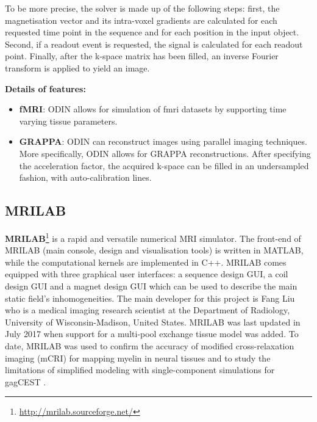 \hfill

To be more precise, the solver is made up of the following steps: first, the magnetisation vector and its intra-voxel gradients are calculated for each requested time point in the sequence and for each position in the input object.
Second, if a readout event is requested, the signal is calculated for each readout point.
Finally, after the k-space matrix has been filled, an inverse Fourier transform is applied to yield an image.

\hfill

\textbf{Details of features:}
\begin{itemize}
    
    \item \textbf{fMRI}: ODIN allows for simulation of \ac{fmri} datasets by supporting time varying tissue parameters.
    
    \item \textbf{GRAPPA}: ODIN can reconstruct images using parallel imaging techniques.
    More specifically, ODIN allows for GRAPPA reconstructions.
    After specifying the acceleration factor, the acquired k-space can be filled in an undersampled fashion, with auto-calibration lines.
    
\end{itemize}

\hfill

\subsection{MRILAB}
\textbf{MRILAB}\footnote{\url{http://mrilab.sourceforge.net/}} is a rapid and versatile numerical MRI simulator. 
The front-end of MRILAB (main console, design and visualisation tools) is written in MATLAB, while the computational kernels are implemented in C++.
MRILAB comes equipped with three graphical user interfaces: a sequence design GUI, a coil design GUI and a magnet design GUI which can be used to describe the main static field's inhomogeneities.
The main developer for this project is Fang Liu who is a medical imaging research scientist at the Department of Radiology, University of Wisconsin-Madison, United States.
MRILAB was last updated in July 2017 when support for a multi-pool exchange tissue model was added.
To date, MRILAB was used to confirm the accuracy of modified cross-relaxation imaging (mCRI) for mapping myelin in neural tissues and to study the limitations of simplified modeling with single-component simulations for gagCEST \cite{Liu2017}.

